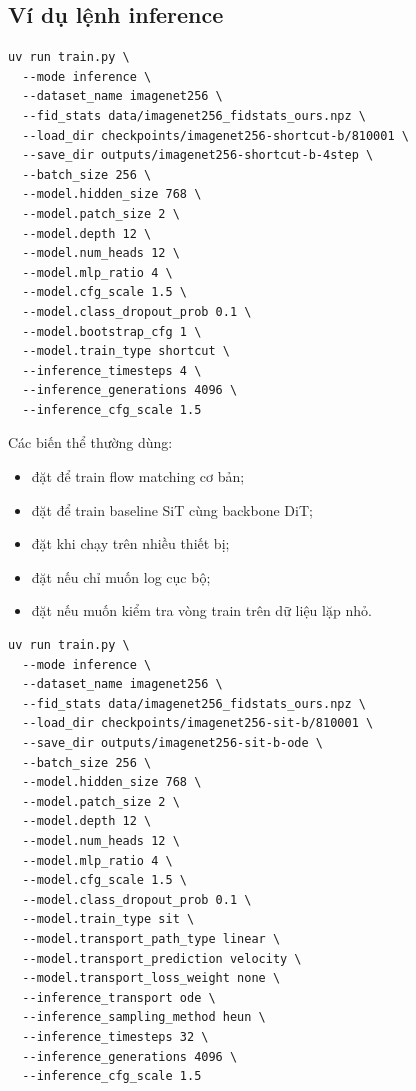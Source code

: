 \subsection{Ví dụ lệnh inference}

\begin{lstlisting}[style=bashstyle,caption={Sampling/FID từ checkpoint đã train}]
uv run train.py \
  --mode inference \
  --dataset_name imagenet256 \
  --fid_stats data/imagenet256_fidstats_ours.npz \
  --load_dir checkpoints/imagenet256-shortcut-b/810001 \
  --save_dir outputs/imagenet256-shortcut-b-4step \
  --batch_size 256 \
  --model.hidden_size 768 \
  --model.patch_size 2 \
  --model.depth 12 \
  --model.num_heads 12 \
  --model.mlp_ratio 4 \
  --model.cfg_scale 1.5 \
  --model.class_dropout_prob 0.1 \
  --model.bootstrap_cfg 1 \
  --model.train_type shortcut \
  --inference_timesteps 4 \
  --inference_generations 4096 \
  --inference_cfg_scale 1.5
\end{lstlisting}

\noindent Các biến thể thường dùng:

\begin{itemize}
    \item đặt  để train flow matching cơ bản;
    \item đặt  để train baseline SiT cùng backbone DiT;
    \item đặt  khi chạy trên nhiều thiết bị;
    \item đặt  nếu chỉ muốn log cục bộ;
    \item đặt  nếu muốn kiểm tra vòng train trên dữ liệu lặp nhỏ.
\end{itemize}

\begin{lstlisting}[style=bashstyle,caption={Inference/FID cho checkpoint SiT với ODE + Heun}]
uv run train.py \
  --mode inference \
  --dataset_name imagenet256 \
  --fid_stats data/imagenet256_fidstats_ours.npz \
  --load_dir checkpoints/imagenet256-sit-b/810001 \
  --save_dir outputs/imagenet256-sit-b-ode \
  --batch_size 256 \
  --model.hidden_size 768 \
  --model.patch_size 2 \
  --model.depth 12 \
  --model.num_heads 12 \
  --model.mlp_ratio 4 \
  --model.cfg_scale 1.5 \
  --model.class_dropout_prob 0.1 \
  --model.train_type sit \
  --model.transport_path_type linear \
  --model.transport_prediction velocity \
  --model.transport_loss_weight none \
  --inference_transport ode \
  --inference_sampling_method heun \
  --inference_timesteps 32 \
  --inference_generations 4096 \
  --inference_cfg_scale 1.5
\end{lstlisting}

